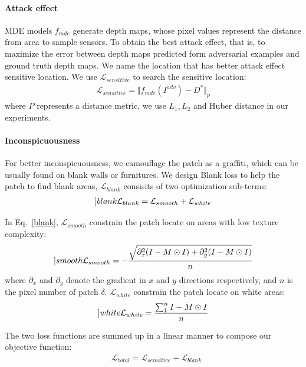 \documentclass[10pt,twocolumn,letterpaper]{article}
\begin{document}
\paragraph{Attack effect}
MDE models $f_{mde}$ generate depth maps, whose pixel values 
represent the distance from area to sample sensors.
To obtain the best attack effect, that is, 
to maximize the error between depth maps predicted form
adversarial examples and ground truth depth maps.
We name the location that has better attack effect sensitive 
location. We use $\mathcal{L}_{sensitive}$ to search the 
sensitive location: 
\begin{align}
\mathcal{L}_{sensitive} = \Vert f_{mde}(I^{adv}) - D^{*} \Vert_{p}
\end{align}
where $P$ represents a distance metric, 
we use $L_1, L_2$ and Huber distance in our experiments.

\paragraph{Inconspicuousness}
For better inconspicuousness, we camouflage the patch 
as a graffiti, which can be usually found on 
blank walls or furnitures. 
We design Blank loss to help the patch to 
find blank areas, $\mathcal{L}_{blank}$
consisits of two optimization sub-terms:
	\begin{align}
		\label[]{blank}
		\mathcal{L}_{blank} = \mathcal{L}_{smooth}+\mathcal{L}_{white}
 	\end{align}

In Eq.~\ref{blank}, $\mathcal{L}_{smooth}$ constrain the patch locate
on areas with low texture complexity:
	\begin{align}
		\label[]{smooth}
		\mathcal{L}_{smooth} = 
		-\frac{\sqrt{\partial_x^2 (I-M \odot I) + \partial_y^2 (I-M \odot I)}}{n} 
 	\end{align}
where $\partial_x$ and $\partial_y$
denote the gradient in $x$ and $y$ directions respectively,
and $n$ is the pixel number of patch $\delta$.
$\mathcal{L}_{white}$ constrain the patch locate
on white areas:
	\begin{align}
		\label[]{white}
		\mathcal{L}_{white} = \frac{\sum_{1}^{n} I-M \odot I}{n} 
 	\end{align}

The two loss functions are summed up in a linear manner 
to compose our objective function:
\begin{equation}
\begin{aligned}
	&\mathcal{L}_{total} = \mathcal{L}_{sensitive} +
	\mathcal{L}_{blank}\\ 
\end{aligned}
\end{equation}
\end{document}
